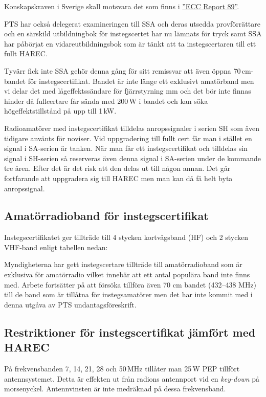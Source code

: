 Konskapskraven i Sverige skall motsvara det som finns i
\href{https://docdb.cept.org/download/409}{''ECC Report 89''}.

PTS har också delegerat examineringen till SSA och deras utsedda
provförrättare och en särskild utbildningbok för instegscertet har nu lämnats
för tryck samt SSA har påbörjat en vidareutbildningsbok som är tänkt att ta
instegscertaren till ett fullt HAREC.

Tyvärr fick inte SSA gehör denna gång för sitt remissvar att även öppna
70\,cm-bandet för instegscertifikat. Bandet är inte länge ett exklusivt
amatörband men vi delar det med lågeffektssändare för fjärrstyrning mm och det
bör inte finnas hinder då fullcertare får sända med 200\,W i bandet och kan
söka högeffektstillstånd på upp till 1\,kW.

Radioamatörer med instegscertifikat tilldelas anropssignaler i serien SH som
även tidigare använts för noviser. Vid uppgradering till fullt cert får man i
stället en signal i SA-serien är tanken. När man får ett instegscertifikat och
tilldelas sin signal i SH-serien så reserveras även denna signal i SA-serien
under de kommande tre åren. Efter det är det risk att den delas ut till någon
annan. Det går fortfarande att uppgradera sig till HAREC men man kan då få
helt byta anropssignal.

\subsection{Amatörradioband för instegscertifikat}

Instegscertifikatet ger tillträde till 4 stycken kortvågsband (HF) och 2
stycken VHF-band enligt tabellen nedan:



\clearpage

Myndigheterna har gett instegscertare tillträde till amatörradioband som är
exklusiva för amatörradio vilket innebär att ett antal populära band inte
finns med. Arbete fortsätter på att försöka tillföra även 70 cm bandet
(432--438 MHz) till de band som är tillåtna för instegsamatörer men det har
inte kommit med i denna utgåva av PTS undantagsföreskrift.

\subsection{Restriktioner för instegscertifikat jämfört med HAREC}

På frekvensbanden 7, 14, 21, 28 och 50\,MHz tillåter man 25\,W PEP tillfört
antennsystemet. Detta är effekten ut från radions antennport vid en {\it
  key-down} på morsenyckel. Antennvinsten är inte medräknad på dessa
frekvensband.

